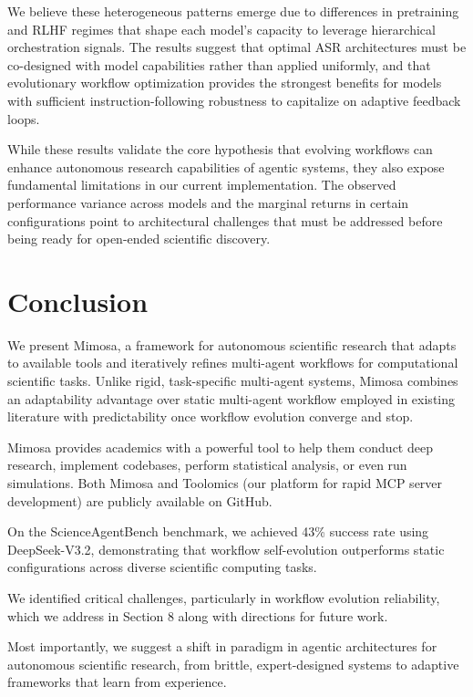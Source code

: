 \documentclass{article}
\begin{document}
We believe these heterogeneous patterns emerge due to differences in pretraining and RLHF regimes that shape each model's capacity to leverage hierarchical orchestration signals. The results suggest that optimal ASR architectures must be co-designed with model capabilities rather than applied uniformly, and that evolutionary workflow optimization provides the strongest benefits for models with sufficient instruction-following robustness to capitalize on adaptive feedback loops.

While these results validate the core hypothesis that evolving workflows can enhance autonomous research capabilities of agentic systems, they also expose fundamental limitations in our current implementation. The observed performance variance across models and the marginal returns in certain configurations point to architectural challenges that must be addressed before being ready for open-ended scientific discovery.

\section{Conclusion}

We present Mimosa, a framework for autonomous scientific research that adapts to available tools and iteratively refines multi-agent workflows for computational scientific tasks. Unlike rigid, task-specific multi-agent systems, Mimosa combines an adaptability advantage over static multi-agent workflow employed in existing literature with predictability once workflow evolution converge and stop.

Mimosa provides academics with a powerful tool to help them conduct deep research, implement codebases, perform statistical analysis, or even run simulations. Both Mimosa and Toolomics (our platform for rapid MCP server development) are publicly available on GitHub.

On the ScienceAgentBench benchmark, we achieved 43\% success rate using DeepSeek-V3.2, demonstrating that workflow self-evolution outperforms static configurations across diverse scientific computing tasks.

We identified critical challenges, particularly in workflow evolution reliability, which we address in Section 8 along with directions for future work.

Most importantly, we suggest a shift in paradigm in agentic architectures for autonomous scientific research, from brittle, expert-designed systems to adaptive frameworks that learn from experience.
\end{document}
